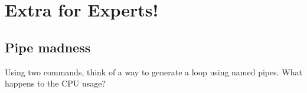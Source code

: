 \documentclass{article}
\begin{document}
\section{Extra for Experts\texttrademark{}!}
\subsection{Pipe madness}
Using two commands, think of a way to generate a loop using named pipes. What happens to the CPU usage?
\end{document}
